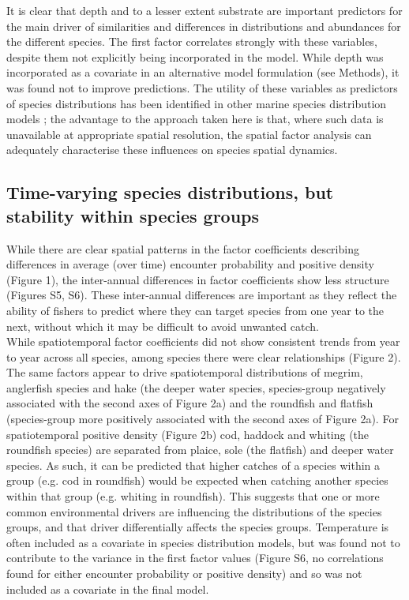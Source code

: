 \documentclass[fleqn,10pt]{wlscirep}
\begin{document}
\begin{linenumbers}
It is clear that depth and to a lesser extent substrate are important
predictors for the main driver of similarities and differences in distributions
and abundances for the different species. The first factor correlates
strongly with these variables, despite them not explicitly being incorporated
in the model. While depth was incorporated as a covariate in an alternative
model formulation (see Methods), it was found not to improve predictions. The
utility of these variables as predictors of species distributions has been
identified in other marine species distribution models \cite{Robinson2011}; the
advantage to the approach taken here is that, where such data is unavailable at
appropriate spatial resolution, the spatial factor analysis can adequately
characterise these influences on species spatial dynamics.\\

\subsection*{Time-varying species distributions, but stability within species
	groups\\} While there are clear spatial patterns in the factor
coefficients describing differences in average (over time) encounter
probability and positive density (Figure 1), the inter-annual differences in
factor coefficients show less structure (Figures S5, S6). These inter-annual
differences are important as they reflect the ability of fishers to predict
where they can target  species from one year to the
next, without which it may be difficult to avoid unwanted catch.\\

While spatiotemporal factor coefficients did not show consistent trends from
year to year across all species, among species there were clear relationships
(Figure 2).  The same factors appear to drive spatiotemporal distributions of
megrim, anglerfish species and hake (the deeper water species,
species-group negatively associated with the second axes of
Figure 2a) and the roundfish and flatfish (species-group
more positively associated with the second axes of Figure 2a). For
spatiotemporal positive density (Figure 2b) cod, haddock and whiting (the
roundfish species) are separated from plaice, sole (the flatfish) and deeper
water species. As such, it can be predicted that higher catches of a species
within a group (e.g. cod in roundfish) would be expected
when catching another species within that group (e.g.
whiting in roundfish). This suggests that one or more common environmental
drivers are influencing the distributions of the species groups, and that
driver differentially affects the species groups.  Temperature is often
included as a covariate in species distribution models, but was found not to
contribute to the variance in the first factor values (Figure S6, no
correlations found for either encounter probability or positive density) and so
was not included as a covariate in the final model.\\


\end{linenumbers}
\end{document}
